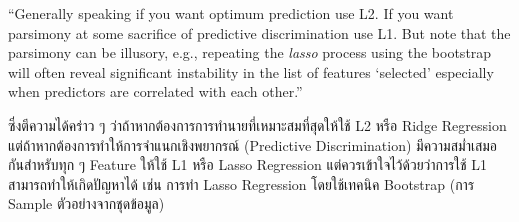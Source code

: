 \begin{framed}
    \enquote{Generally speaking if you want optimum prediction use L2. 
    If you want parsimony at some sacrifice of predictive discrimination use L1. 
    But note that the parsimony can be illusory, e.g., repeating the \textit{lasso} 
    process using the bootstrap will often reveal significant instability 
    in the list of features \enquote{selected} especially when predictors are 
    correlated with each other.}
\end{framed}

ซึ่งตีความได้คร่าว ๆ ว่าถ้าหากต้องการการทำนายที่เหมาะสมที่สุดให้ใช้ L2 หรือ Ridge Regression แต่ถ้าหากต้องการทำให้การจำแนกเชิงพยากรณ์
(Predictive Discrimination) มีความสม่ำเสมอกันสำหรับทุก ๆ Feature ให้ใช้ L1 หรือ Lasso Regression แต่ควรเข้าใจไว้ด้วยว่าการใช้ L1 สามารถทำให้เกิดปัญหาได้ เช่น การทำ Lasso Regression โดยใช้เทคนิค Bootstrap (การ Sample ตัวอย่างจากชุดข้อมูล)
